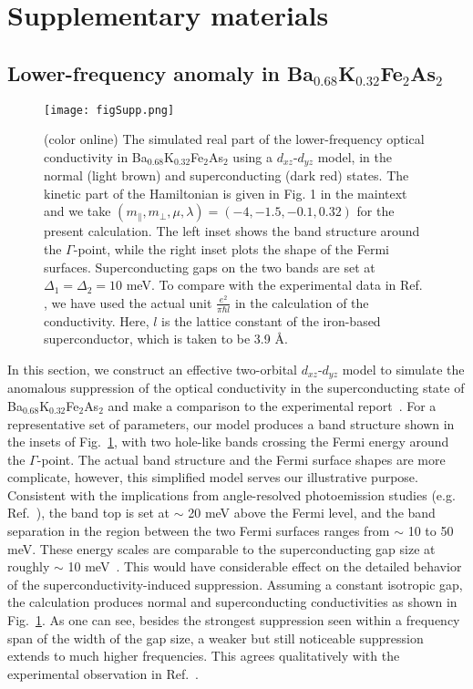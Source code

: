 \documentclass[prl,floatfix,twocolumn,showpacs,amsmath,superscriptaddress]{revtex4-2}
\begin{document}
\newpage
\section{Supplementary materials}
\renewcommand\thefigure{S}
\setcounter{figure}{0}
\subsection{Lower-frequency anomaly in Ba$_{0.68}$K$_{0.32}$Fe$_{2}$As$_2$}

\begin{figure}
	\texttt{[image: figSupp.png]}
	\caption{(color online) The simulated real part of the lower-frequency optical conductivity in Ba$_{0.68}$K$_{0.32}$Fe$_{2}$As$_2$ using a $d_{xz}$-$d_{yz}$ model, in the normal (light brown) and superconducting (dark red) states. The kinetic part of the Hamiltonian is given in Fig. 1 in the maintext and we take $(m_\parallel, m_\perp, \mu, \lambda)=(-4, -1.5, -0.1, 0.32)$ for the present calculation. The left inset shows the band structure around the $\Gamma$-point, while the right inset plots the shape of the Fermi surfaces. Superconducting gaps on the two bands are set at $\Delta_1=\Delta_2=10$ meV. To compare with the experimental data in Ref. \cite{ref2}, we have used the actual unit $\frac{e^2}{\pi \hbar l}$ in the calculation of the conductivity. Here, $l$ is the lattice constant of the iron-based superconductor, which is taken to be 3.9 \r{A}.}
	\label{figSupp}
\end{figure}

In this section, we construct an effective two-orbital $d_{xz}$-$d_{yz}$ model to simulate the anomalous suppression of the optical conductivity in the superconducting state of Ba$_{0.68}$K$_{0.32}$Fe$_{2}$As$_2$ and make a comparison to the experimental report~\cite{ref2}. For a representative set of parameters, our model produces a band structure shown in the insets of Fig.~\ref{figSupp}, with two hole-like bands crossing the Fermi energy around the $\Gamma$-point. The actual band structure and the Fermi surface shapes are more complicate, however, this simplified model serves our illustrative purpose. Consistent with the implications from angle-resolved photoemission studies (e.g. Ref.~), the band top is set at $\sim$ 20 meV above the Fermi level, and the band separation in the region between the two Fermi surfaces ranges from $\sim$ 10 to 50 meV. These energy scales are comparable to the superconducting gap size at roughly $\sim$ 10 meV~\cite{ref2}. This would have considerable effect on the detailed behavior of the superconductivity-induced suppression. Assuming a constant isotropic gap, the calculation produces normal and superconducting conductivities as shown in Fig.~\ref{figSupp}. As one can see, besides the strongest suppression seen within a frequency span of the width of the gap size, a weaker but still noticeable suppression extends to much higher frequencies. This agrees qualitatively with the experimental observation in Ref.~. 
\end{document}
